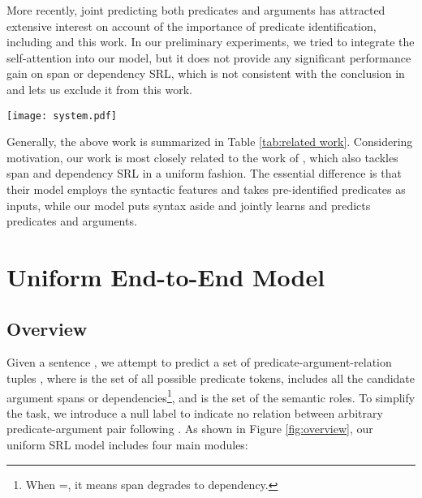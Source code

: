 \documentclass[letterpaper]{article} \usepackage{aaai19}  \usepackage{times}  \usepackage{helvet}  \usepackage{courier}  \usepackage{url}  \usepackage{graphicx}  \frenchspacing  \setlength{\pdfpagewidth}{8.5in}  \setlength{\pdfpageheight}{11in}
\begin{document}
More recently, joint predicting both predicates and arguments has attracted extensive interest on account of the importance of predicate identification, including \cite{he-acl2017,Strubell2018,he2018jointly,cai2018full} and this work.
In our preliminary experiments, we tried to integrate the self-attention into our model,
but it does not provide any significant performance gain on span or dependency SRL, which is not consistent with the conclusion in \cite{selfatt2018} and lets us exclude it from this work. 




\begin{figure*}
	\centering
	\texttt{[image: system.pdf]}
	\caption{\label{fig:overview} The framework of our end-to-end model for uniform SRL.}
\end{figure*}


Generally, the above work is summarized in Table \ref{tab:related work}. Considering motivation, our work is most closely related to the work of \citeauthor{Fitzgerald2015} , which also tackles span and dependency SRL in a uniform fashion. The essential difference is that their model employs the syntactic features and takes pre-identified predicates as inputs, while our model puts syntax aside and jointly learns and predicts predicates and arguments. 







\section{Uniform End-to-End Model}




\subsection{Overview}

Given a sentence , we attempt to predict a set of predicate-argument-relation tuples , where  is the set of all possible predicate tokens,  includes all the candidate argument spans or dependencies\footnote{When =, it means span degrades to dependency.}, and  is the set of the semantic roles. To simplify the task, we introduce a null label  to indicate no relation between arbitrary predicate-argument pair following \citeauthor{he2018jointly} . As shown in Figure \ref{fig:overview}, our uniform SRL model includes four main modules: 
\end{document}
